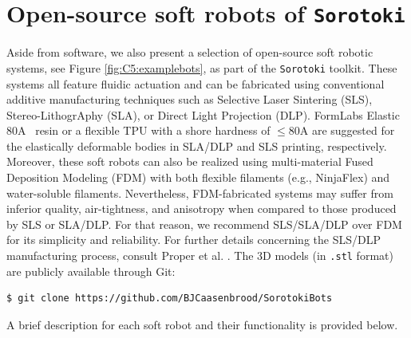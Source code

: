\section{Open-source soft robots of \texttt{Sorotoki}}
Aside from software, we also present a selection of open-source soft robotic systems,  see Figure \ref{fig:C5:examplebots}, as part of the \texttt{Sorotoki} toolkit. These systems all feature fluidic actuation and can be fabricated using conventional additive manufacturing techniques such as Selective Laser Sintering (SLS), Stereo-LithogrAphy (SLA), or Direct Light Projection (DLP). FormLabs Elastic 80A\texttrademark
\, resin or a flexible TPU with a shore hardness of $\le 80$A are suggested for the elastically deformable bodies in SLA/DLP and SLS printing, respectively. Moreover, these soft robots can also be realized using multi-material Fused Deposition Modeling (FDM) with both flexible filaments (e.g., NinjaFlex) and water-soluble filaments. Nevertheless, FDM-fabricated systems may suffer from inferior quality, air-tightness, and anisotropy when compared to those produced by SLS or SLA/DLP. For that reason, we recommend SLS/SLA/DLP over FDM for its simplicity and reliability. For further details concerning the SLS/DLP manufacturing process, consult Proper et al. \cite{Proper2023}. The 3D models (in \texttt{.stl} format) are publicly available through Git:
%
\begin{lstlisting}[style=terminal]
$ git clone https://github.com/BJCaasenbrood/SorotokiBots
\end{lstlisting}
%
A brief description for each soft robot and their functionality is provided below. \\
